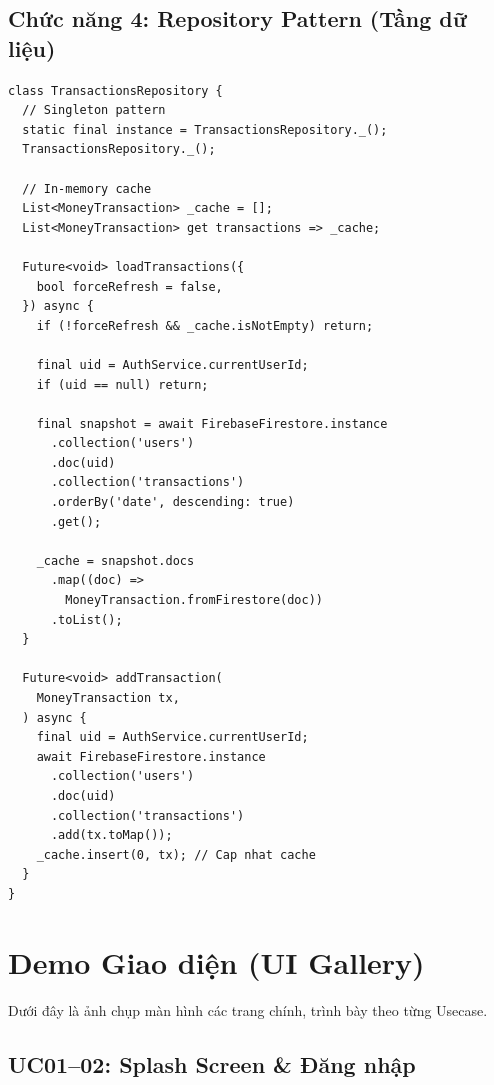 \subsection{Chức năng 4: Repository Pattern (Tầng dữ liệu)}

\begin{lstlisting}[caption={TransactionsRepository --- Singleton + Cache + CRUD}]
class TransactionsRepository {
  // Singleton pattern
  static final instance = TransactionsRepository._();
  TransactionsRepository._();

  // In-memory cache
  List<MoneyTransaction> _cache = [];
  List<MoneyTransaction> get transactions => _cache;

  Future<void> loadTransactions({
    bool forceRefresh = false,
  }) async {
    if (!forceRefresh && _cache.isNotEmpty) return;

    final uid = AuthService.currentUserId;
    if (uid == null) return;

    final snapshot = await FirebaseFirestore.instance
      .collection('users')
      .doc(uid)
      .collection('transactions')
      .orderBy('date', descending: true)
      .get();

    _cache = snapshot.docs
      .map((doc) =>
        MoneyTransaction.fromFirestore(doc))
      .toList();
  }

  Future<void> addTransaction(
    MoneyTransaction tx,
  ) async {
    final uid = AuthService.currentUserId;
    await FirebaseFirestore.instance
      .collection('users')
      .doc(uid)
      .collection('transactions')
      .add(tx.toMap());
    _cache.insert(0, tx); // Cap nhat cache
  }
}
\end{lstlisting}


\section{Demo Giao diện (UI Gallery)}

Dưới đây là ảnh chụp màn hình các trang chính, trình bày theo từng Usecase.


\subsection{UC01--02: Splash Screen \& Đăng nhập}

